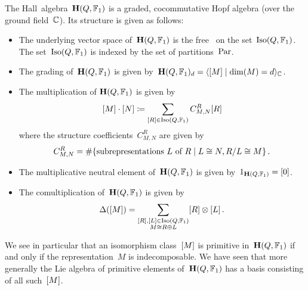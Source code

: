 \documentclass[a4paper,11pt]{scrartcl}
\begin{document}
\begin{recall}
  The Hall~algebra~$\mathbf{H}(Q, \mathbb{F}_1)$ is a graded, cocommutative Hopf algebra (over the ground field~$\Complex$).
  Its structure is given as follows:
  \begin{itemize}
    \item
      The underlying vector space of~$\mathbf{H}(Q, \mathbb{F}_1)$ is the free~\vectorspace{$\Complex$} on the set~$\operatorname{Iso}(Q, \mathbb{F}_1)$.
      The set~$\operatorname{Iso}(Q, \mathbb{F}_1)$ is indexed by the set of partitions~$\mathrm{Par}$.
    \item
      The grading of~$\mathbf{H}(Q, \mathbb{F}_1)$ is given by~$\Hall(Q, \Finite_1)_d = \gen{ \class{M} \suchthat \dim(M) = d }_{\Complex}$.
    \item
      The multiplication of$~\mathbf{H}(Q, \mathbb{F}_1)$ is given by
      \[
        [M] \cdot [N]
        \coloneqq
        \sum_{[R] \in \operatorname{Iso}(Q, \mathbb{F}_1)}
        C^R_{M,N} [R]
      \]
      where the structure coefficients~$C^R_{M,N}$ are given by
      \[
        C^R_{M,N}
        =
        \counting
        \{
          \text{subrepresentations~$L$ of~$R$}
        \suchthat
          L \cong N, R/L \cong M
        \} \,.
      \]
    \item
      The multiplicative neutral element of~$\mathbf{H}(Q, \mathbb{F}_1)$ is given by~$1_{\mathbf{H}(Q, \mathbb{F}_1)} = [0]$.
    \item
      The comultiplication of~$\mathbf{H}(Q, \mathbb{F}_1)$ is given by
      \[
        \Delta( [M] )
        =
        \sum_{
          \substack{
            [R], [L] \in \operatorname{Iso}(Q, \mathbb{F}_1) \\
            M \cong R \oplus L
          }
        }
        [R] \otimes [L] \,.
      \]
  \end{itemize}
  We see in particular that an isomorphism class~$[M]$ is primitive in~$\mathbf{H}(Q, \mathbb{F}_1)$ if and only if the representation~$M$ is indecomposable.
  We have seen that more generally the Lie algebra of primitive elements of~$\mathbf{H}(Q, \mathbb{F}_1)$ has a basis consisting of all such~$[M]$.
\end{recall}
\end{document}
